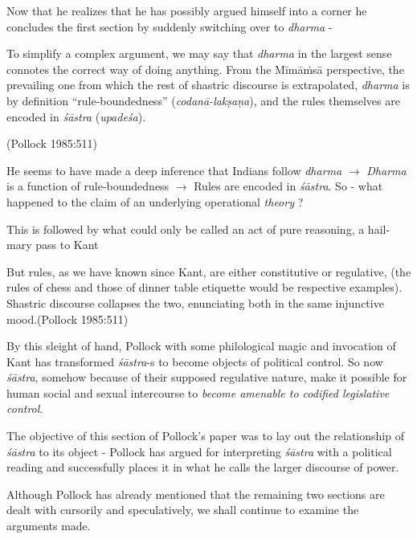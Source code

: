 Now that he realizes that he has possibly argued himself into a corner he concludes the first section by suddenly switching over to {\sl dharma} -
\begin{myquote}
To simplify a complex argument, we may say that {\sl dharma} in the largest sense connotes the correct way of doing anything. From the Mīmāṁsā perspective, the prevailing one from which the rest of shastric discourse is extrapolated, {\sl dharma} is by definition ``rule-boundedness'' ({\sl codanā-lakṣaṇa}), and the rules themselves are encoded in {\sl śāstra} ({\sl upadeśa}).

\hfill (Pollock 1985:511)
\end{myquote}

He seems to have made a deep inference that Indians follow {\sl dharma} $\to$ {\sl Dharma} is a function of rule-boundedness $\to$ Rules are encoded in {\sl śāstra}. So - what happened to the claim of an underlying operational {\sl theory} ?

\newpage

This is followed by what could only be called an act of pure reasoning, a hail-mary pass to Kant
\begin{myquote}
But rules, as we have known since Kant, are either constitutive or regulative, (the rules of chess and those of dinner table etiquette would be respective examples). Shastric discourse collapses the two, enunciating both in the same injunctive mood.\hfill (Pollock 1985:511)
\end{myquote}

By this sleight of hand, Pollock with some philological magic and invocation of Kant has transformed {\sl śāstra}-s to become objects of political control. So now {\sl śāstra}, somehow because of their supposed regulative nature, make it possible for human social and sexual intercourse to {\sl become amenable to codified legislative control}.

The objective of this section of Pollock's paper was to lay out the relationship of {\sl śāstra} to its object - Pollock has argued for interpreting {\sl śāstra} with a political reading and successfully places it in what he calls the larger discourse of power.

Although Pollock has already mentioned that the remaining two sections are dealt with cursorily and speculatively, we shall continue to examine the arguments made.


